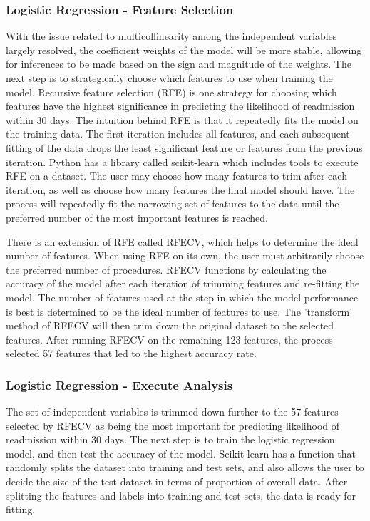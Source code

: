 \documentclass[sigconf]{acmart}
\begin{document}
\subsubsection{Logistic Regression - Feature Selection}

With the issue related to multicollinearity among the independent variables largely resolved, the coefficient weights of the model will be more stable, allowing for inferences to be made based on the sign and magnitude of the weights. The next step is to strategically choose which features to use when training the model. Recursive feature selection (RFE) is one strategy for choosing which features have the highest significance in predicting the likelihood of readmission within 30 days. The intuition behind RFE is that it repeatedly fits the model on the training data. The first iteration includes all features, and each subsequent fitting of the data drops the least significant feature or features from the previous iteration. Python has a library called scikit-learn which includes tools to execute RFE on a dataset. The user may choose how many features to trim after each iteration, as well as choose how many features the final model should have. The process will repeatedly fit the narrowing set of features to the data until the preferred number of the most important features is reached.

There is an extension of RFE called RFECV, which helps to determine the ideal number of features. When using RFE on its own, the user must arbitrarily choose the preferred number of procedures. RFECV functions by calculating the accuracy of the model after each iteration of trimming features and re-fitting the model. The number of features used at the step in which the model performance is best is determined to be the ideal number of features to use. The 'transform' method of RFECV will then trim down the original dataset to the selected features. After running RFECV on the remaining 123 features, the process selected 57 features that led to the highest accuracy rate. 

\subsubsection{Logistic Regression - Execute Analysis}

The set of independent variables is trimmed down further to the 57 features selected by RFECV as being the most important for predicting likelihood of readmission within 30 days. The next step is to train the logistic regression model, and then test the accuracy of the model. Scikit-learn has a function that randomly splits the dataset into training and test sets, and also allows the user to decide the size of the test dataset in terms of proportion of overall data. After splitting the features and labels into training and test sets, the data is ready for fitting.
\end{document}
